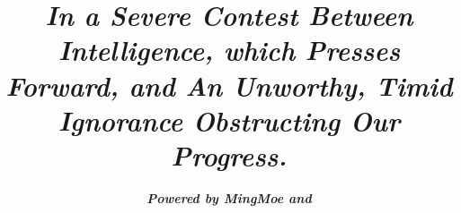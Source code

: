 \documentclass[11pt,oneside,a4paper]{ctexart}
\author{\bfseries\slshape\sffamily{}Powered by MingMoe and \XeLaTeX{}}
\title{\fontsize{40}{3}\bfseries\slshape\sffamily{}In a Severe Contest Between Intelligence, which Presses Forward, and An Unworthy, Timid Ignorance Obstructing Our Progress.}
\begin{document}
\maketitle
\newpage{}

\end{document}
